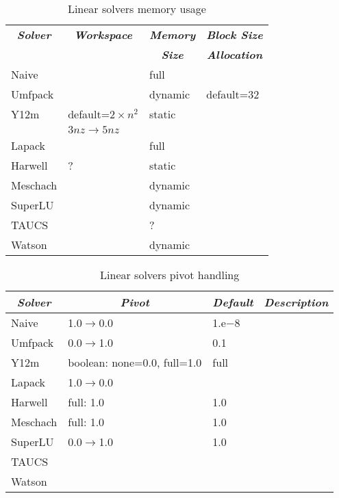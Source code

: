 \begin{table}
\centering
\caption{Linear solvers memory usage}\label{tab:linear-solvers-memory}
\begin{tabular}{llll}
\hline\hline
	\multicolumn{1}{c}{\textbf{\emph{Solver}}} &
	\multicolumn{1}{c}{\textbf{\emph{Workspace}}} &
	\multicolumn{1}{c}{\textbf{\emph{Memory}}} &
	\multicolumn{1}{c}{\textbf{\emph{Block Size}}} \\
	&
	&
	\multicolumn{1}{c}{\textbf{\emph{Size}}} &
	\multicolumn{1}{c}{\textbf{\emph{Allocation}}} \\
\hline
	Naive		& 			& full		&		\\
	Umfpack 	& 			& dynamic	& default=32	\\
	Y12m 		& default=$2\times{n^2}$& static	&		\\
			& $3nz \rightarrow 5nz$	&		&		\\
	Lapack		&			& full		&		\\
	Harwell		& ?			& static	&		\\
	Meschach	& 			& dynamic	&		\\
	SuperLU		& 			& dynamic 	&		\\
	TAUCS		&			& ?		&		\\
	Watson		&			& dynamic	&		\\
\hline\hline
\end{tabular}
\end{table}

\begin{table}
\centering
\caption{Linear solvers pivot handling}\label{tab:linear-solvers-pivot}
\begin{tabular}{llll}
\hline\hline
	\multicolumn{1}{c}{\textbf{\emph{Solver}}} &
	\multicolumn{1}{c}{\textbf{\emph{Pivot}}} &
	\multicolumn{1}{c}{\textbf{\emph{Default}}} &
	\multicolumn{1}{c}{\textbf{\emph{Description}}} \\
\hline
	Naive		& 1.0$\rightarrow$0.0		& 1.e$-8$	& \\
	Umfpack 	& 0.0$\rightarrow$1.0 		& 0.1 		& \\
	Y12m 		& boolean: none=0.0, full=1.0	& full		& \\
	Lapack		& 1.0$\rightarrow$0.0		&		& \\
	Harwell		& full: 1.0			& 1.0		& \\
	Meschach	& full: 1.0			& 1.0		& \\
	SuperLU		& 0.0$\rightarrow$1.0		& 1.0		& \\
	TAUCS		&				&		& \\
	Watson		&				&		& \\
\hline\hline
\end{tabular}
\end{table}



